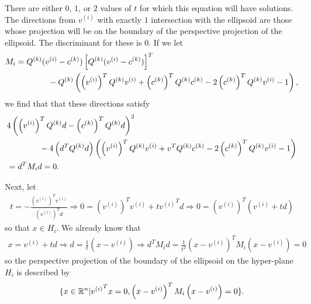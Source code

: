 
There are either $0$, $1$, or $2$ values of $t$ for which this equation will have solutions.
The directions from $v^{(i)}$ with exactly $1$ intersection with the ellipsoid are those whose projection will be on the boundary of the perspective projection of the ellipsoid.
The discriminant for these is $0$.
If we let
\begin{align*}
M_i &= 
{Q^{(k)}} (v^{(i)} - c^{(k)} )\left[{Q^{(k)}} (v^{(i)} - c^{(k)} )\right]^T \\
&\quad \quad \quad \quad- {Q^{(k)}}  \left(\left(v^{(i)}\right)^T {Q^{(k)}}  v^{(i)} + \left(c^{(k)}\right) ^T {Q^{(k)}}  c^{(k)}  - 2 \left(c^{(k)}\right) ^T {Q^{(k)}}  v^{(i)} - 1\right),
\end{align*}
we find that that these directions satisfy
\begin{align*}
&4\left(\left(v^{(i)}\right)^T {Q^{(k)}}  d - \left(c^{(k)} \right) ^T{Q^{(k)}} d\right)^2 \\
&\quad \quad \quad \quad- 4 \left(d^T{Q^{(k)}} d\right) \left(\left(v^{(i)}\right)^T {Q^{(k)}}  v^{(i)} + v ^T {Q^{(k)}}  c^{(k)}  - 2 \left(c^{(k)}\right) ^T {Q^{(k)}}  v^{(i)} - 1\right) \\
&= d^TM_id = 0.
\end{align*}


Next, let
\begin{align*}
t = -\frac {\left(v^{(i)}\right)^T v^{(i)}}{\left(v^{(i)}\right)^T d } \Longrightarrow
0 = \left(v^{(i)}\right)^T v^{(i)} + t {v^{(i)}}^T d \Longrightarrow
0 = \left(v^{(i)}\right)^T \left(v^{(i)} + t d\right)
\end{align*}
so that $x \in H_i$.
We already know that
\begin{align*}
x = v^{(i)} + t d \Longrightarrow
d = \frac 1 t \left(x - v^{(i)}\right)
\Longrightarrow d^TM_id = \frac 1 {t^2} \left(x - v^{(i)}\right)^TM_i\left(x - v^{(i)}\right) = 0
\end{align*}
so the perspective projection of the boundary of the ellipsoid on the hyper-plane $H_i$ is described by
\begin{align*}
\{x \in \mathbb R^n | {v^{(i)}}^Tx = 0, \left(x - v^{(i)}\right)^TM_i\left(x - v^{(i)}\right) = 0\}.
\end{align*}

